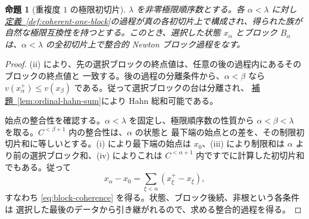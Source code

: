 \documentclass[11pt,uplatex,dvipdfmx]{jsarticle}
\newcommand{\namedref}[2]{\hyperref[#2]{#1~\ref*{#2}}}
\theoremstyle{proofnote}
\newtheorem{proposition}[theorem]{命題}
\begin{document}
\begin{proposition}[重複度 \(1\) の極限初切片]
\label{prop:one-block-limit-prefix}
  \(\lambda\) を非零極限順序数とする。各 \(\alpha<\lambda\) に対し
  \namedref{定義}{def:coherent-one-block}の過程が真の各初切片上で構成され、得られた族が
  自然な極限互換性を持つとする。このとき、選択した状態 \(x_\alpha\) とブロック
  \(B_\alpha\) は、\(\alpha<\lambda\) の全初切片上で整合的 Newton ブロック過程をなす。
\end{proposition}
\begin{proof}
  (ii) により、先の選択ブロックの終点値は、任意の後の過程内にあるそのブロックの終点値と
  一致する。後の過程の分離条件から、\(\alpha<\beta\) なら
  \(v(x_\alpha^+)\le v(x_\beta)\) である。従って選択ブロックの台は分離され、
  \namedref{補題}{lem:ordinal-hahn-sum}により Hahn 総和可能である。

  始点の整合性を確認する。\(\alpha<\lambda\) を固定し、極限順序数の性質から
  \(\alpha<\beta<\lambda\) を取る。\(C^{<\beta+1}\) 内の整合性は、\(\alpha\) の状態と
  最下端の始点との差を、その制限初切片和に等しいとする。(i) により最下端の始点は
  \(x_0\)、(iii) により制限和は \(\alpha\) より前の選択ブロック和、(iv) によりこれは
  \(C^{<\alpha+1}\) 内ですでに計算した初切片和でもある。従って
  \[
    x_\alpha-x_0=\sum_{\xi<\alpha}(x_\xi^+-x_\xi),
  \]
  すなわち \eqref{eq:block-coherence} を得る。状態、ブロック後続、非根という各条件は
  選択した最後のデータから引き継がれるので、求める整合的過程を得る。
\end{proof}
\end{document}
